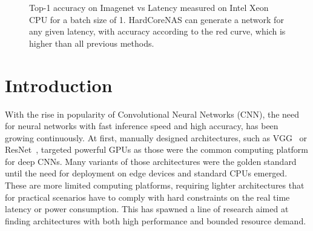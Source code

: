 \documentclass[dvipsnames,table,xcdraw]{article}
\begin{document}
\begin{figure}[t]
\begin{adjustbox}{width=0.5\textwidth}
\end{adjustbox}
\vspace*{-7mm}
\caption{Top-1 accuracy on Imagenet vs Latency measured on Intel Xeon CPU for a batch size of 1. HardCoreNAS can generate a network for any given latency, with accuracy according to the red curve, which is higher than all previous methods.}
\label{fig:acc_nas}
\end{figure}




 \section{Introduction}
With the rise in popularity of Convolutional Neural Networks (CNN), the need for neural networks with fast inference speed and high accuracy, has been growing continuously. At first, manually designed architectures, such as VGG~\cite{VGG} or ResNet~\cite{ResNet}, targeted powerful GPUs as those were the common computing platform for deep CNNs. Many variants of those architectures were the golden standard until the need for deployment on edge devices and standard CPUs emerged. These are more limited computing platforms, requiring lighter architectures that for practical scenarios have to comply with hard constraints on the real time latency or power consumption. This has spawned a line of research aimed at finding architectures with both high performance and bounded resource demand. 
\end{document}
